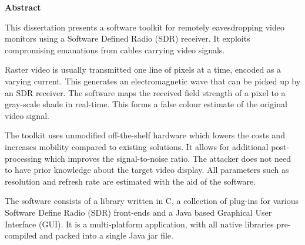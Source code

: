 \newpage
{\Huge \bf Abstract}
\vspace{24pt} 


This dissertation presents a software toolkit for remotely eavesdropping video monitors using a Software Defined Radio (SDR) receiver. It exploits compromising emanations from cables carrying video signals.

Raster video is usually transmitted one line of pixels at a time, encoded as a varying current. This generates an electromagnetic wave that can be picked up by an SDR receiver. The software maps the received field strength of a pixel to a gray-scale shade in real-time. This forms a false colour estimate of the original video signal.

The toolkit uses unmodified off-the-shelf hardware which lowers the costs and increases mobility compared to existing solutions. It allows for additional post-processing which improves the signal-to-noise ratio. The attacker does not need to have prior knowledge about the target video display. All parameters such as resolution and refresh rate are estimated with the aid of the software. 

The software consists of a library written in C, a collection of plug-ins for various Software Define Radio (SDR) front-ends and a Java based Graphical User Interface (GUI). It is a multi-platform application, with all native libraries pre-compiled and packed into a single Java jar file.


\newpage
\vspace*{\fill}
